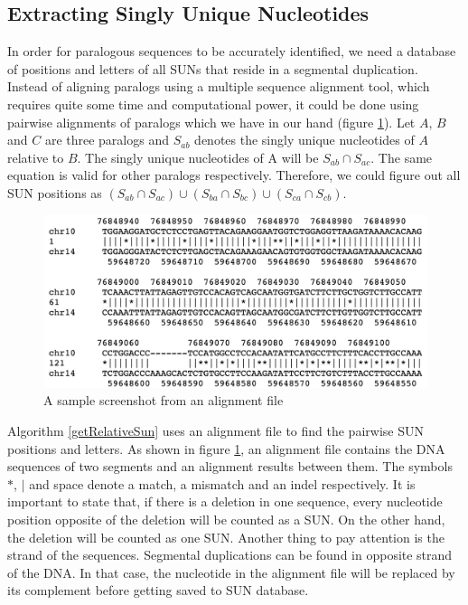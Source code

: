 \subsection{Extracting Singly Unique Nucleotides}
In order for paralogous sequences to be accurately identified, we need a database of positions and letters of all SUNs that reside in a segmental duplication. Instead of aligning paralogs using a multiple sequence alignment tool, which requires quite some time and computational power, it could be done using pairwise alignments of paralogs which we have in our hand (figure \ref{alignmentFile}). Let $A$, $B$ and $C$ are three paralogs and  $S_{ab}$ denotes the singly unique nucleotides of $A$ relative to $B$. The singly unique nucleotides of A will be $S_{ab} \cap S_{ac}$. The same equation is valid for other paralogs respectively. Therefore, we could figure out all SUN positions as $(S_{ab} \cap S_{ac}) \cup (S_{ba} \cap S_{bc}) \cup (S_{ca} \cap S_{cb})$.

\begin{figure}[ht]
    \centering
    \includegraphics[scale=0.4]{images/alignmentFile.png}
    \caption{A sample screenshot from an alignment file}
    \label{alignmentFile}
\end{figure}

Algorithm \ref{getRelativeSun} uses an alignment file to find the pairwise SUN positions and letters. As shown in figure \ref{alignmentFile}, an alignment file contains the DNA sequences of two segments and an alignment results between them. The symbols $*$, $|$ and space denote a match, a mismatch and an indel respectively. It is important to state that, if there is a deletion in one sequence, every nucleotide position opposite of the deletion will be counted as a SUN. On the other hand, the deletion will be counted as one SUN. Another thing to pay attention is the strand of the sequences. Segmental duplications can be found in opposite strand of the DNA. In that case, the nucleotide in the alignment file will be replaced by its complement before getting saved to SUN database.

